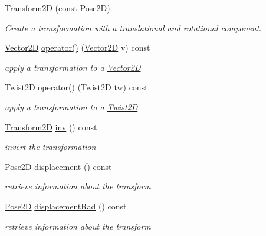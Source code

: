 \begin{DoxyCompactItemize}
\hyperlink{classrigid2d_1_1Transform2D_a7eee10e3bf1cfdc0df928b9401750dba}{Transform2D} (const \hyperlink{structrigid2d_1_1Pose2D}{Pose2D})
\begin{DoxyCompactList}\small\item\em Create a transformation with a translational and rotational component. \end{DoxyCompactList}\item 
\hyperlink{structrigid2d_1_1Vector2D}{Vector2D} \hyperlink{classrigid2d_1_1Transform2D_aab68d8df21419767d4291e226e0a3481}{operator()} (\hyperlink{structrigid2d_1_1Vector2D}{Vector2D} v) const
\begin{DoxyCompactList}\small\item\em apply a transformation to a \hyperlink{structrigid2d_1_1Vector2D}{Vector2D} \end{DoxyCompactList}\item 
\hyperlink{structrigid2d_1_1Twist2D}{Twist2D} \hyperlink{classrigid2d_1_1Transform2D_ad31ac545a107b5aea5a9a2c69b77ab6c}{operator()} (\hyperlink{structrigid2d_1_1Twist2D}{Twist2D} tw) const
\begin{DoxyCompactList}\small\item\em apply a transformation to a \hyperlink{structrigid2d_1_1Twist2D}{Twist2D} \end{DoxyCompactList}\item 
\hyperlink{classrigid2d_1_1Transform2D}{Transform2D} \hyperlink{classrigid2d_1_1Transform2D_a921bb5138fd83e48aaf75349dfd51653}{inv} () const
\begin{DoxyCompactList}\small\item\em invert the transformation \end{DoxyCompactList}\item 
\hyperlink{structrigid2d_1_1Pose2D}{Pose2D} \hyperlink{classrigid2d_1_1Transform2D_adb4a148944f3629222080db727397f0a}{displacement} () const
\begin{DoxyCompactList}\small\item\em retrieve information about the transform \end{DoxyCompactList}\item 
\hyperlink{structrigid2d_1_1Pose2D}{Pose2D} \hyperlink{classrigid2d_1_1Transform2D_a95c036e753f2a5a44086a15462c20064}{displacement\+Rad} () const
\begin{DoxyCompactList}\small\item\em retrieve information about the transform \end{DoxyCompactList}\item 

\end{DoxyCompactItemize}
